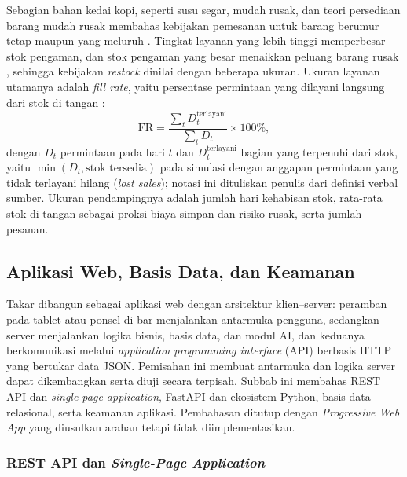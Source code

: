 Sebagian bahan kedai kopi, seperti susu segar, mudah rusak, dan teori persediaan barang mudah rusak membahas kebijakan pemesanan untuk barang berumur tetap maupun yang meluruh \citep*{nahmias1982perishable}. Tingkat layanan yang lebih tinggi memperbesar stok pengaman, dan stok pengaman yang besar menaikkan peluang barang rusak \citep*{yigit2023novel}, sehingga kebijakan \textit{restock} dinilai dengan beberapa ukuran. Ukuran layanan utamanya adalah \textit{fill rate}, yaitu persentase permintaan yang dilayani langsung dari stok di tangan \citep*{goltsos2022inventory}:
\begin{equation}
\mathrm{FR} = \frac{\sum_{t} D_t^{\mathrm{terlayani}}}{\sum_{t} D_t} \times 100\%,
\label{eq:fill-rate}
\end{equation}
dengan $D_t$ permintaan pada hari $t$ dan $D_t^{\mathrm{terlayani}}$ bagian yang terpenuhi dari stok, yaitu $\min(D_t, \text{stok tersedia})$ pada simulasi dengan anggapan permintaan yang tidak terlayani hilang (\textit{lost sales}); notasi ini dituliskan penulis dari definisi verbal sumber. Ukuran pendampingnya adalah jumlah hari kehabisan stok, rata-rata stok di tangan sebagai proksi biaya simpan dan risiko rusak, serta jumlah pesanan.

\subsection{Aplikasi Web, Basis Data, dan Keamanan}
\label{subsec:sistem-web}

Takar dibangun sebagai aplikasi web dengan arsitektur klien--server: peramban pada tablet atau ponsel di bar menjalankan antarmuka pengguna, sedangkan server menjalankan logika bisnis, basis data, dan modul AI, dan keduanya berkomunikasi melalui \textit{application programming interface} (API) berbasis HTTP yang bertukar data JSON. Pemisahan ini membuat antarmuka dan logika server dapat dikembangkan serta diuji secara terpisah. Subbab ini membahas REST API dan \textit{single-page application}, FastAPI dan ekosistem Python, basis data relasional, serta keamanan aplikasi. Pembahasan ditutup dengan \textit{Progressive Web App} yang diusulkan arahan tetapi tidak diimplementasikan.

\subsubsection{REST API dan \texorpdfstring{\textit{Single-Page Application}}{Single-Page Application}}
\label{subsubsec:rest-spa}

